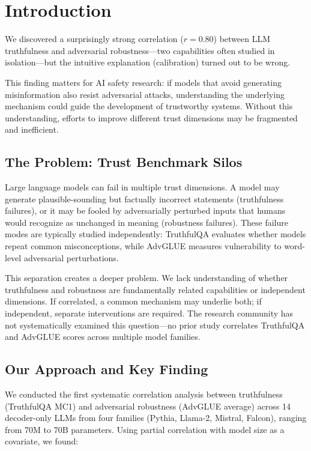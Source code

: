 \section{Introduction}

We discovered a surprisingly strong correlation ($r=0.80$) between LLM truthfulness and adversarial robustness---two capabilities often studied in isolation---but the intuitive explanation (calibration) turned out to be wrong.

This finding matters for AI safety research: if models that avoid generating misinformation also resist adversarial attacks, understanding the underlying mechanism could guide the development of trustworthy systems. Without this understanding, efforts to improve different trust dimensions may be fragmented and inefficient.

\subsection{The Problem: Trust Benchmark Silos}

Large language models can fail in multiple trust dimensions. A model may generate plausible-sounding but factually incorrect statements (truthfulness failures), or it may be fooled by adversarially perturbed inputs that humans would recognize as unchanged in meaning (robustness failures). These failure modes are typically studied independently: TruthfulQA \cite{lin2022truthfulqa} evaluates whether models repeat common misconceptions, while AdvGLUE \cite{wang2022advglue} measures vulnerability to word-level adversarial perturbations.

This separation creates a deeper problem. We lack understanding of whether truthfulness and robustness are fundamentally related capabilities or independent dimensions. If correlated, a common mechanism may underlie both; if independent, separate interventions are required. The research community has not systematically examined this question---no prior study correlates TruthfulQA and AdvGLUE scores across multiple model families.

\subsection{Our Approach and Key Finding}

We conducted the first systematic correlation analysis between truthfulness (TruthfulQA MC1) and adversarial robustness (AdvGLUE average) across 14 decoder-only LLMs from four families (Pythia, Llama-2, Mistral, Falcon), ranging from 70M to 70B parameters. Using partial correlation with model size as a covariate, we found:

